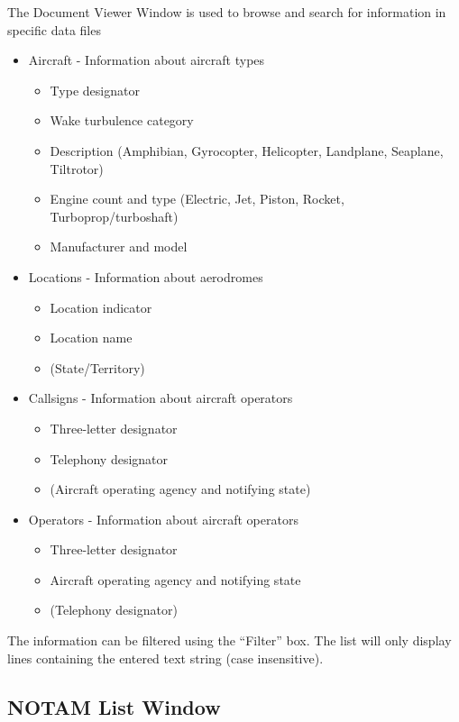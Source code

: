 \documentclass[11pt,a4paper]{memoir}
\begin{document}
The Document Viewer Window is used to browse and search for information in specific data files

\begin{itemize}
    \item Aircraft - Information about aircraft types
    \begin{itemize}
        \item Type designator
        \item Wake turbulence category
        \item Description (Amphibian, Gyrocopter, Helicopter, Landplane, Seaplane, Tiltrotor)
        \item Engine count and type (Electric, Jet, Piston, Rocket, Turboprop/turboshaft)
        \item Manufacturer and model
    \end{itemize}
    \item Locations - Information about aerodromes
    \begin{itemize}
        \item Location indicator
        \item Location name
        \item (State/Territory)
    \end{itemize}
    \item Callsigns - Information about aircraft operators
    \begin{itemize}
        \item Three-letter designator
        \item Telephony designator
        \item (Aircraft operating agency and notifying state)
    \end{itemize}   
    \item Operators - Information about aircraft operators
    \begin{itemize}
        \item Three-letter designator
        \item Aircraft operating agency and notifying state
        \item (Telephony designator)
    \end{itemize}
\end{itemize}

The information can be filtered using the “Filter” box. The list will only display lines containing the entered text string (case insensitive).

\subsection{NOTAM List Window}
\label{win:notamlw}
\end{document}
